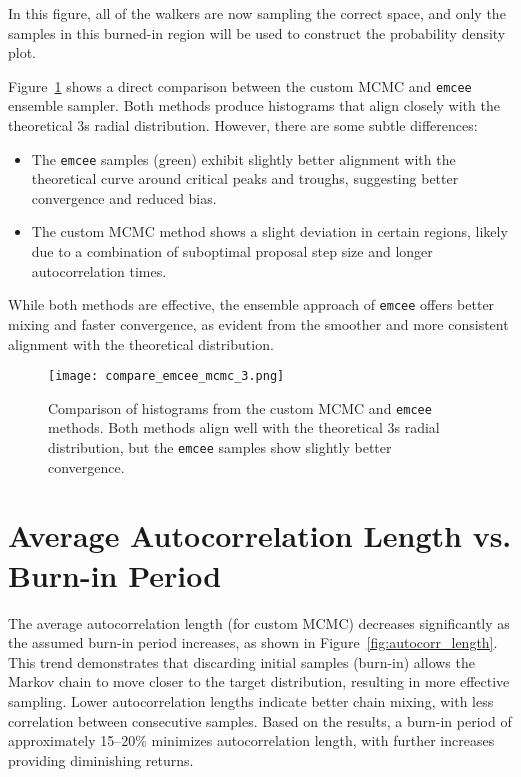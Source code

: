 \documentclass[twocolumn, 11pt]{article}
\begin{document}
In this figure, all of the walkers are now sampling the correct space, and only the samples in this burned-in region will be used to construct the probability density plot. 


Figure~\ref{fig:comparison_histogram} shows a direct comparison between the custom MCMC and \texttt{emcee} ensemble sampler. Both methods produce histograms that align closely with the theoretical 3s radial distribution. However, there are some subtle differences:
\begin{itemize}
    \item The \texttt{emcee} samples (green) exhibit slightly better alignment with the theoretical curve around critical peaks and troughs, suggesting better convergence and reduced bias.
    \item The custom MCMC method shows a slight deviation in certain regions, likely due to a combination of suboptimal proposal step size and longer autocorrelation times.
\end{itemize}

While both methods are effective, the ensemble approach of \texttt{emcee} offers better mixing and faster convergence, as evident from the smoother and more consistent alignment with the theoretical distribution.

\begin{figure}[h!]
    \centering
    \texttt{[image: compare\_emcee\_mcmc\_3.png]}
    \caption{Comparison of histograms from the custom MCMC and \texttt{emcee} methods. Both methods align well with the theoretical 3s radial distribution, but the \texttt{emcee} samples show slightly better convergence.}
    \label{fig:comparison_histogram}
\end{figure}


\section{Average Autocorrelation Length vs. Burn-in Period}
The average autocorrelation length (for custom MCMC) decreases significantly as the assumed burn-in period increases, as shown in Figure~\ref{fig:autocorr_length}. This trend demonstrates that discarding initial samples (burn-in) allows the Markov chain to move closer to the target distribution, resulting in more effective sampling. Lower autocorrelation lengths indicate better chain mixing, with less correlation between consecutive samples. Based on the results, a burn-in period of approximately 15--20\% minimizes autocorrelation length, with further increases providing diminishing returns.
 
\end{document}

